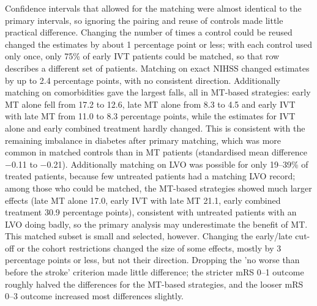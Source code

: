 Confidence intervals that allowed for the matching were almost identical to the primary intervals, so ignoring the pairing and reuse of controls made little practical difference. Changing the number of times a control could be reused changed the estimates by about 1 percentage point or less; with each control used only once, only 75\% of early IVT patients could be matched, so that row describes a different set of patients. Matching on exact NIHSS changed estimates by up to 2.4 percentage points, with no consistent direction. Additionally matching on comorbidities gave the largest falls, all in MT-based strategies: early MT alone fell from 17.2 to 12.6, late MT alone from 8.3 to 4.5 and early IVT with late MT from 11.0 to 8.3 percentage points, while the estimates for IVT alone and early combined treatment hardly changed. This is consistent with the remaining imbalance in diabetes after primary matching, which was more common in matched controls than in MT patients (standardised mean difference $-$0.11 to $-$0.21). Additionally matching on LVO was possible for only 19--39\% of treated patients, because few untreated patients had a matching LVO record; among those who could be matched, the MT-based strategies showed much larger effects (late MT alone 17.0, early IVT with late MT 21.1, early combined treatment 30.9 percentage points), consistent with untreated patients with an LVO doing badly, so the primary analysis may underestimate the benefit of MT. This matched subset is small and selected, however. Changing the early/late cut-off or the cohort restrictions changed the size of some effects, mostly by 3 percentage points or less, but not their direction. Dropping the 'no worse than before the stroke' criterion made little difference; the stricter mRS 0--1 outcome roughly halved the differences for the MT-based strategies, and the looser mRS 0--3 outcome increased most differences slightly.

